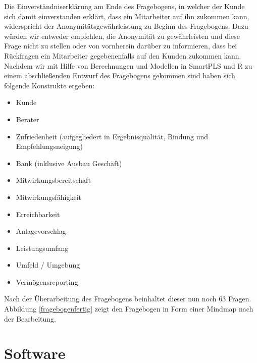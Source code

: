 \documentclass{article}\usepackage[]{graphicx}\usepackage[]{color}
\begin{document}
Die Einverständniserklärung am Ende des Fragebogens, in welcher der Kunde sich damit einverstanden erklärt, dass ein Mitarbeiter auf ihn zukommen kann, widerspricht der Anonymitätsgewährleistung zu Beginn des Fragebogens. Dazu würden wir entweder empfehlen, die Anonymität zu gewährleisten und diese Frage nicht zu stellen oder von vornherein darüber zu informieren, dass bei Rückfragen ein Mitarbeiter gegebenenfalls auf den Kunden zukommen kann.\\
Nachdem wir mit Hilfe von Berechnungen und Modellen in SmartPLS und R zu einem abschließenden Entwurf des Fragebogens gekommen sind haben sich folgende Konstrukte ergeben:

\begin{itemize}
\item Kunde
\item Berater
\item Zufriedenheit (aufgegliedert in Ergebnisqualität, Bindung und Empfehlungsneigung)
\item Bank (inklusive Ausbau Geschäft)
\item Mitwirkungsbereitschaft
\item Mitwirkungsfähigkeit
\item Erreichbarkeit
\item Anlagevorschlag
\item Leistungsumfang
\item Umfeld / Umgebung
\item Vermögensreporting
\end{itemize}

Nach der Überarbeitung des Fragebogens beinhaltet dieser nun noch 63 Fragen. Abbildung \ref{fragebogenfertig} zeigt den Fragebogen in Form einer Mindmap nach der Bearbeitung.




\label{fragebogenfertig}







\section{Software}%
\end{document}
